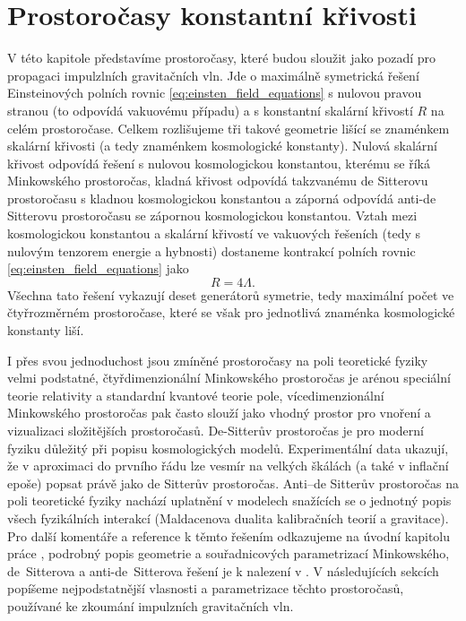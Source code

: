 \chapter{Prostoročasy konstantní křivosti}
\label{chap:kap01}
V této kapitole představíme prostoročasy, které budou sloužit jako pozadí pro propagaci impulzlních gravitačních vln. Jde o maximálně
symetrická řešení Einsteinových polních rovnic \eqref{eq:einsten_field_equations} s nulovou pravou stranou (to odpovídá vakuovému případu) a s konstantní skalární křivostí $R$ na celém prostoročase.
Celkem rozlišujeme tři takové geometrie lišící se znaménkem skalární křivosti (a tedy znaménkem kosmologické konstanty). Nulová skalární křivost odpovídá řešení s nulovou
kosmologickou konstantou, kterému se říká Minkowského prostoročas, kladná křivost odpovídá takzvanému de Sitterovu prostoročasu s kladnou kosmologickou
konstantou a záporná odpovídá anti-de Sitterovu prostoročasu se zápornou kosmologickou konstantou. Vztah mezi kosmologickou konstantou a skalární
křivostí ve vakuových řešeních (tedy s nulovým tenzorem energie a hybnosti) dostaneme kontrakcí polních rovnic \eqref{eq:einsten_field_equations} jako
\begin{equation}
     R = 4 \Lambda.
\end{equation}
Všechna tato řešení vykazují deset generátorů symetrie, tedy maximální počet ve čtyřrozměrném prostoročase, které se však pro jednotlivá znaménka kosmologické konstanty liší.

I přes svou jednoduchost jsou zmíněné prostoročasy na poli teoretické fyziky velmi podstatné, čtyřdimenzionální Minkowského prostoročas je arénou speciální
teorie relativity a standardní kvantové teorie pole, vícedimenzionální Minkowského prostoročas pak často slouží jako vhodný prostor pro vnoření a vizualizaci složitějších prostoročasů.
De-Sitterův prostoročas je pro moderní fyziku důležitý při popisu kosmologických modelů. Experimentální data
ukazují, že v aproximaci do prvního řádu lze vesmír na velkých škálách (a také v inflační epoše) popsat právě jako de Sitterův prostoročas.
Anti--de Sitterův prostoročas na poli teoretické fyziky nachází uplatnění v modelech snažících se o jednotný popis všech fyzikálních interakcí (Maldacenova dualita kalibračních teorií a gravitace).
Pro další komentáře a reference k těmto řešením odkazujeme na úvodní kapitolu práce \cite{Bicak:2000ea}, podrobný popis geometrie a souřadnicových parametrizací Minkowského, de~Sitterova a anti-de~Sitterova
řešení je k nalezení v \cite{griffiths_podolsky_2009}. V následujících sekcích popíšeme nejpodstatnější vlasnosti
a parametrizace těchto prostoročasů, používané ke zkoumání impulzních gravitačních vln.

